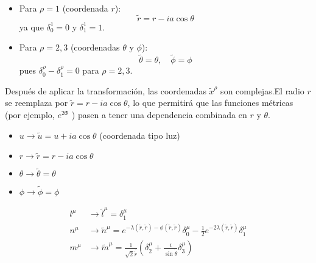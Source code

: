 \begin{enumerate}[1]
\begin{itemize}
              \item Para $\rho=1$ (coordenada $r$):
                    \begin{equation}
                        \tilde{r}=r-i a \cos \theta
                    \end{equation}
                    ya que $\delta_0^1=0$ y $\delta_1^1=1$.

              \item Para $\rho=2,3$ (coordenadas $\theta$ y $\phi$):
                    \begin{equation}
                        \tilde{\theta}=\theta, \quad \tilde{\phi}=\phi
                    \end{equation}
                    pues $\delta_0^\rho-\delta_1^\rho=0$ para $\rho=2,3$.
          \end{itemize}

          Después de aplicar la transformación, las coordenadas $\tilde{x}^\rho$ son complejas.El radio $r$ se reemplaza por $\tilde{r}=r-i a \cos \theta$, lo que permitirá que las funciones métricas (por ejemplo, $e^{2 \Phi}$ ) pasen a tener una dependencia combinada en $r$ y $\theta$.
          \begin{itemize}
            \item $u \rightarrow \tilde{u}=u + ia \cos \theta$ (coordenada tipo luz)
              \item $r \rightarrow \tilde{r}=r - i a \cos \theta$
              \item $\theta \rightarrow \tilde{\theta}=\theta$
              \item $\phi \rightarrow \tilde{\phi}=\phi$
          \end{itemize}
          \begin{equation}
              \begin{aligned}
                  l^\mu & \rightarrow \tilde{l}^\mu=\delta_1^\mu                                                                                                                             \\
                  n^\mu & \rightarrow \tilde{n}^\mu=e^{-\lambda(\tilde{r}, \tilde{r})-\phi(\tilde{r}, \tilde{r})} \delta_0^\mu-\frac{1}{2} e^{-2 \lambda(\tilde{r}, \tilde{r})} \delta_1^\mu \\
                  m^\mu & \rightarrow \tilde{m}^\mu=\frac{1}{\sqrt{2} \overline{\tilde{r}}} \left(\delta_2^\mu+\frac{i}{\sin \tilde{\theta}} \delta_3^\mu\right)
              \end{aligned}
          \end{equation}



\end{enumerate}
